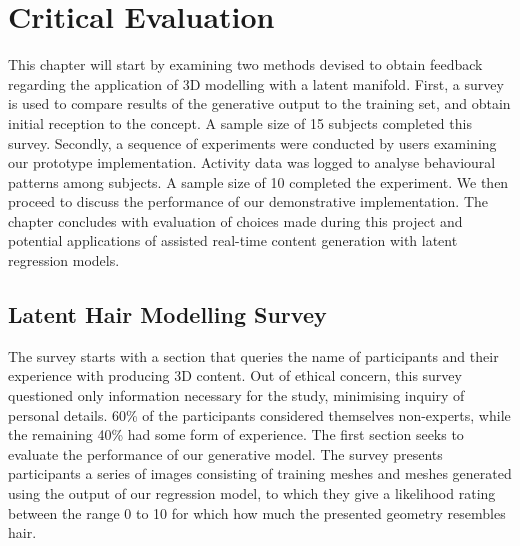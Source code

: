\documentclass[ %
author={Dillon Keith Diep},
supervisor={Dr. Carl Henrik Ek},
degree={MEng},
title={ART-CG:},
subtitle={Assisted Real-time Content Generation of 3D Hair by Learning Manifolds},
type={Research},
year={2017} ]{dissertation}
\begin{document}
\chapter{Critical Evaluation}
\label{chap:evaluation}
This chapter will start by examining two methods devised to obtain feedback regarding the application of 3D modelling with a latent manifold. First, a survey is used to compare results of the generative output to the training set, and obtain initial reception to the concept. A sample size of 15 subjects completed this survey. Secondly, a sequence of experiments were conducted by users examining our prototype implementation. Activity data was logged to analyse behavioural patterns among subjects. A sample size of 10 completed the experiment. We then proceed to discuss the performance of our demonstrative implementation. The chapter concludes with evaluation of choices made during this project and potential applications of assisted real-time content generation with latent regression models.

\section{Latent Hair Modelling Survey}
The survey starts with a section that queries the name of participants and their experience with producing 3D content. Out of ethical concern, this survey questioned only information necessary for the study, minimising inquiry of personal details. 60\% of the participants considered themselves non-experts, while the remaining 40\% had some form of experience. The first section seeks to evaluate the performance of our generative model. The survey presents participants a series of images consisting of training meshes and meshes generated using the output of our regression model, to which they give a likelihood rating between the range 0 to 10 for which how much the presented geometry resembles hair. 
\end{document}

